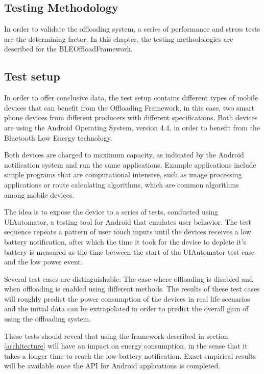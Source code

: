 \documentclass[twoside]{article}
\begin{document}
\begin{multicols}{2}
\section{Testing Methodology}
\label{results}

In order to validate the offloading system, a series of performance and stress tests are the determining factor. In this chapter, the testing methodologies are described for the BLEOffloadFramework.

\subsection{Test setup}

In order to offer conclusive data, the test setup contains different types of mobile devices that can benefit from the Offloading Framework, in this case, two smart phone devices from different producers with different specifications. Both devices are using the Android Operating System, version 4.4, in order to benefit from the Bluetooth Low Energy technology.

Both devices are charged to maximum capacity, as indicated by the Android notification system and run the same applications. Example applications include simple programs that are computational intensive, such as image processing applications or route calculating algorithms, which are common algorithms among mobile devices.

The idea is to expose the device to a series of tests, conducted using UIAutomator, a testing tool for Android that emulates user behavior. The test sequence repeats a pattern of user touch inputs until the devices receives a low battery notification, after which the time it took for the device to deplete it's battery is measured as the time between the start of the UIAutomator test case and the low power event.

Several test cases are distinguishable: The case where offloading is disabled and when offloading is enabled using different methods. The results of these test cases will roughly predict the power consumption of the devices in real life scenarios and the initial data can be extrapolated in order to predict the overall gain of using the offloading system.

These tests should reveal that using the framework described in section \ref{architecture} will have an impact on energy consumption, in the sense that it takes a longer time to reach the low-battery notification. Exact empirical results will be available once the API for Android applications is completed.


\end{multicols}
\end{document}
